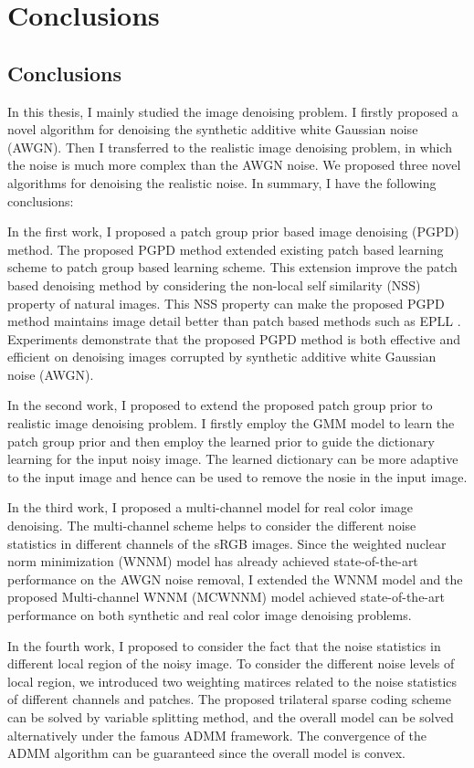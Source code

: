 %
\chapter{Conclusions}
\label{sec:conclusions}


\section{Conclusions}
\label{sec:conclusions:sec1}
In this thesis, I mainly studied the image denoising problem. I firstly proposed a novel algorithm for denoising the synthetic additive white Gaussian noise (AWGN). Then I transferred to the realistic image denoising problem, in which the noise is much more complex than the AWGN noise. We proposed three novel algorithms for denoising the realistic noise. In summary, I have the following conclusions:

In the first work, I proposed a patch group prior based image denoising (PGPD) method. The proposed PGPD method extended existing patch based learning scheme to patch group based learning scheme. This extension improve the patch based denoising method by considering the non-local self similarity (NSS) property of natural images. This NSS property can make the proposed PGPD method maintains image detail better than patch based methods such as EPLL \cite{epll}. Experiments demonstrate that the proposed PGPD method is both effective and efficient on denoising images corrupted by synthetic additive white Gaussian noise (AWGN).

In the second work, I proposed to extend the proposed patch group prior to realistic image denoising problem. I firstly employ the GMM model to learn the patch group prior and then employ the learned prior to guide the dictionary learning for the input noisy image. The learned dictionary can be more adaptive to the input image and hence can be used to remove the nosie in the input image.

In the third work, I proposed a multi-channel model for real color image denoising. The multi-channel scheme helps to consider the different noise statistics in different channels of the sRGB images. Since the weighted nuclear norm minimization (WNNM) model has already achieved state-of-the-art performance on the AWGN noise removal, I extended the WNNM model and the proposed Multi-channel WNNM (MCWNNM) model achieved state-of-the-art performance on both synthetic and real color image denoising problems. 

In the fourth work, I proposed to consider the fact that the noise statistics in different local region of the noisy image. To consider the different noise levels of local region, we introduced two weighting matirces related to the noise statistics of different channels and patches. The proposed trilateral sparse coding scheme can be solved by variable splitting method, and the overall model can be solved alternatively under the famous ADMM framework. The convergence of the ADMM algorithm can be guaranteed since the overall model is convex.


